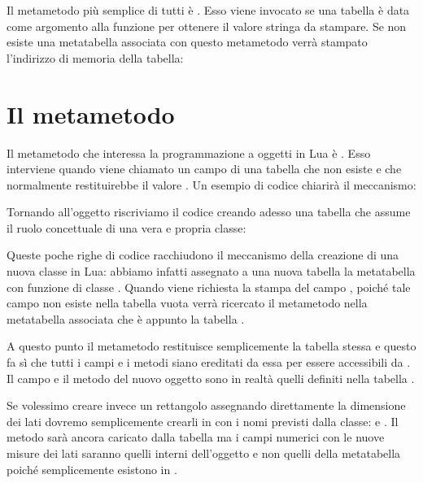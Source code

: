 Il metametodo più semplice di tutti è . Esso viene invocato se
una tabella è data come argomento alla funzione  per
ottenere il valore stringa da stampare. Se non esiste una metatabella associata
con questo metametodo verrà stampato l'indirizzo di memoria della tabella:


\section{Il metametodo }
\label{secFondMetaIndex}

Il metametodo che interessa la programmazione a oggetti in Lua è
. Esso interviene quando viene chiamato un campo
di una tabella che non esiste e che normalmente restituirebbe il valore
. Un esempio di codice chiarirà il meccanismo:

Tornando all'oggetto  riscriviamo il codice creando adesso una
tabella che assume il ruolo concettuale di una vera e propria classe:

Queste poche righe di codice racchiudono il meccanismo della creazione di una
nuova classe in Lua: abbiamo infatti assegnato a una nuova tabella  la
metatabella con funzione di classe . Quando viene richiesta la
stampa del campo , poiché tale campo non esiste nella tabella vuota
 verrà ricercato il metametodo  nella metatabella
associata che è appunto la tabella .

A questo punto il metametodo restituisce semplicemente la tabella
 stessa e questo fa sì che tutti i campi e i metodi siano
ereditati da essa per essere accessibili da . Il campo  e il
metodo  del nuovo oggetto  sono in realtà quelli definiti nella
tabella .

Se volessimo creare invece un rettangolo assegnando direttamente la dimensione
dei lati dovremo semplicemente crearli in  con i nomi previsti dalla
classe:  e . Il metodo  sarà ancora caricato dalla
tabella  ma i campi numerici con le nuove misure dei lati
saranno quelli interni dell'oggetto  e non quelli della metatabella
poiché semplicemente esistono in .

